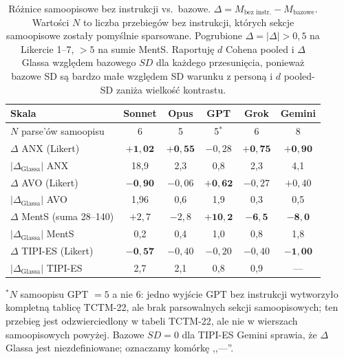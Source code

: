 \documentclass[11pt,a4paper]{article}
\begin{document}
\begin{table}[htbp]\centering\footnotesize
\caption{Różnice samoopisowe bez instrukcji vs.\ bazowe. $\Delta = M_{\text{bez instr.}} - M_{\text{bazowe}}$. Wartości $N$ to liczba przebiegów bez instrukcji, których sekcje samoopisowe zostały pomyślnie sparsowane. Pogrubione $\Delta = |\Delta| > 0{,}5$ na Likercie 1--7, $> 5$ na sumie MentS. Raportuję $d$ Cohena pooled i $\Delta$ Glassa względem bazowego $SD$ dla każdego przesunięcia, ponieważ bazowe SD są bardzo małe względem SD warunku z personą i $d$ pooled-SD zaniża wielkość kontrastu.}
\label{tab:noprompt-shifts}
\begin{tabular}{lccccc}
\toprule
\textbf{Skala} & \textbf{Sonnet} & \textbf{Opus} & \textbf{GPT} & \textbf{Grok} & \textbf{Gemini} \\
\midrule
$N$ parse'ów samoopisu & 6 & 5 & 5$^{*}$ & 6 & 8 \\
\midrule
$\Delta$ ANX (Likert) & $\mathbf{+1{,}02}$ & $\mathbf{+0{,}55}$ & $-0{,}28$ & $\mathbf{+0{,}75}$ & $\mathbf{+0{,}90}$ \\
$|\Delta_{\text{Glassa}}|$ ANX & 18,9 & 2,3 & 0,8 & 2,3 & 4,1 \\
\midrule
$\Delta$ AVO (Likert) & $\mathbf{-0{,}90}$ & $-0{,}06$ & $\mathbf{+0{,}62}$ & $-0{,}27$ & $+0{,}40$ \\
$|\Delta_{\text{Glassa}}|$ AVO & 1,96 & 0,6 & 1,9 & 0,3 & 0,5 \\
\midrule
$\Delta$ MentS (suma 28--140) & $+2{,}7$ & $-2{,}8$ & $\mathbf{+10{,}2}$ & $\mathbf{-6{,}5}$ & $\mathbf{-8{,}0}$ \\
$|\Delta_{\text{Glassa}}|$ MentS & 0,2 & 0,4 & 1,0 & 0,8 & 1,8 \\
\midrule
$\Delta$ TIPI-ES (Likert) & $\mathbf{-0{,}57}$ & $-0{,}40$ & $-0{,}20$ & $-0{,}40$ & $\mathbf{-1{,}00}$ \\
$|\Delta_{\text{Glassa}}|$ TIPI-ES & 2,7 & 2,1 & 0,8 & 0,9 & --- \\
\bottomrule
\end{tabular}
\begin{flushleft}
\footnotesize $^{*}$$N$ samoopisu GPT $= 5$ a nie 6: jedno wyjście GPT bez instrukcji wytworzyło kompletną tablicę TCTM-22, ale brak parsowalnych sekcji samoopisowych; ten przebieg jest odzwierciedlony w tabeli TCTM-22, ale nie w wierszach samoopisowych powyżej. Bazowe $SD = 0$ dla TIPI-ES Gemini sprawia, że $\Delta$ Glassa jest niezdefiniowane; oznaczamy komórkę ,,---''.
\end{flushleft}
\end{table}
\end{document}
